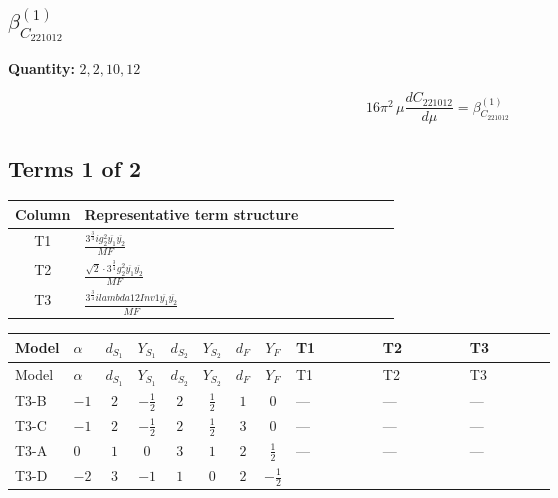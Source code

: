 \documentclass[8pt]{article}
\begin{document}
\begin{landscape}
\section*{$\beta_{C_{221012}}^{(1)}$}
\noindent\textbf{Quantity: }$\mathrm{2,2,10,12}$\par\smallskip
\[16\pi^2\,\mu\frac{d C_{221012}}{d\mu}=\beta_{C_{221012}}^{(1)}\]
\subsection*{Terms 1 of 2}
\begin{center}
\begin{tabular}{@{}c >{\raggedright\arraybackslash}p{0.82\linewidth}@{}}
\toprule
Column & Representative term structure \\
\midrule
T1 & \(\displaystyle \frac{3^{\frac{3}{4}} i g_{2}^{2} \overline{y_{1}} \overline{y_{2}}}{MF}\) \\
\midrule
T2 & \(\displaystyle \frac{\sqrt{2} \cdot 3^{\frac{3}{4}} g_{2}^{2} \overline{y_{1}} \overline{y_{2}}}{MF}\) \\
\midrule
T3 & \(\displaystyle \frac{3^{\frac{3}{4}} i lambda12Inv1 \overline{y_{1}} \overline{y_{2}}}{MF}\) \\
\midrule
\bottomrule
\end{tabular}
\end{center}
\smallskip
\tiny
\begin{longtable}{@{}llcccccc >{\raggedright\arraybackslash}p{0.21\linewidth} >{\raggedright\arraybackslash}p{0.21\linewidth} >{\raggedright\arraybackslash}p{0.21\linewidth}@{}}
\toprule
Model & $\alpha$ & $d_{S_1}$ & $Y_{S_1}$ & $d_{S_2}$ & $Y_{S_2}$ & $d_F$ & $Y_F$ & T1 & T2 & T3 \\
\midrule
\endfirsthead
\toprule
Model & $\alpha$ & $d_{S_1}$ & $Y_{S_1}$ & $d_{S_2}$ & $Y_{S_2}$ & $d_F$ & $Y_F$ & T1 & T2 & T3 \\
\midrule
\endhead
T3-B & $-1$ & $2$ & $-\frac{1}{2}$ & $2$ & $\frac{1}{2}$ & $1$ & $0$ & --- & --- & --- \\
\midrule
T3-C & $-1$ & $2$ & $-\frac{1}{2}$ & $2$ & $\frac{1}{2}$ & $3$ & $0$ & --- & --- & --- \\
\midrule
T3-A & $0$ & $1$ & $0$ & $3$ & $1$ & $2$ & $\frac{1}{2}$ & --- & --- & --- \\
\midrule
T3-D & $-2$ & $3$ & $-1$ & $1$ & $0$ & $2$ & $-\frac{1}{2}$ & \scriptsize\adjustbox{max width=\linewidth}{$\begin{gathered} - \frac{17 \cdot 3^{\frac{3}{4}} i g_{2}^{2} \overline{y_{1}} \overline{y_{2}}}{24 MF}\end{gathered}$} & \scriptsize\adjustbox{max width=\linewidth}{$\begin{gathered} - \frac{\sqrt{2} \cdot 3^{\frac{3}{4}} g_{2}^{2} \overline{y_{1}} \overline{y_{2}}}{3 MF}\end{gathered}$} & \scriptsize\adjustbox{max width=\linewidth}{$\begin{gathered} - \frac{3^{\frac{3}{4}} i lambda12Inv1 \overline{y_{1}} \overline{y_{2}}}{6 MF}\end{gathered}$} \\

\end{longtable}
\end{landscape}
\end{document}
